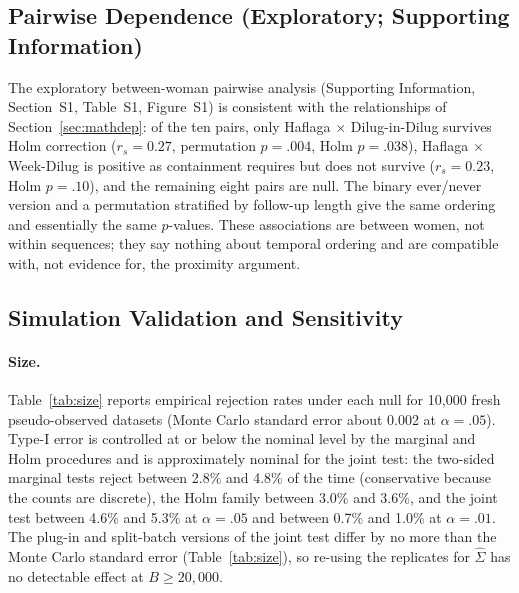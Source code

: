 \documentclass[12pt]{article}
\begin{document}
\subsection{Pairwise Dependence (Exploratory; Supporting Information)}
\label{sec:chisq}

The exploratory between-woman pairwise analysis (Supporting Information, Section~S1,
Table~S1, Figure~S1) is consistent with the relationships of Section~\ref{sec:mathdep}:
of the ten pairs, only Haflaga $\times$ Dilug-in-Dilug survives Holm correction
($r_s = 0.27$, permutation $p = .004$, Holm $p = .038$), Haflaga $\times$ Week-Dilug is
positive as containment requires but does not survive ($r_s = 0.23$, Holm $p = .10$),
and the remaining eight pairs are null. The binary ever/never version and a permutation
stratified by follow-up length give the same ordering and essentially the same $p$-values.
These associations are between women, not within sequences; they say nothing about
temporal ordering and are compatible with, not evidence for, the proximity argument.

\subsection{Simulation Validation and Sensitivity}
\label{sec:simresults}

\paragraph{Size.}
Table~\ref{tab:size} reports empirical rejection rates under each null for 10,000 fresh
pseudo-observed datasets (Monte Carlo standard error about 0.002 at $\alpha = .05$).
Type-I error is controlled at or below the nominal level by the marginal and Holm
procedures and is approximately nominal for the joint test: the two-sided marginal tests
reject between 2.8\% and 4.8\% of the time (conservative because the counts are
discrete), the Holm family between 3.0\% and 3.6\%, and the joint test between 4.6\% and
5.3\% at $\alpha = .05$ and between 0.7\% and 1.0\% at $\alpha = .01$. The plug-in and
split-batch versions of the joint test differ by no more than the Monte Carlo standard
error (Table~\ref{tab:size}), so re-using the replicates for $\hat\Sigma$ has no
detectable effect at $B \geq 20{,}000$.
\end{document}
